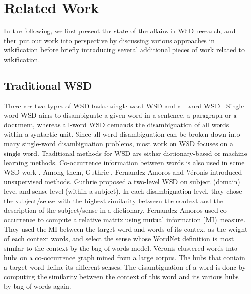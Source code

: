 \section{Related Work}
\label{sec:related}

In the following, we first present the state of the affairs in WSD research,
and then put our work into perspective by discussing
various approaches in wikification before briefly introducing several
additional pieces of work related to wikification.

\subsection{Traditional WSD}
There are two types of WSD tasks: single-word WSD and
all-word WSD . Single word WSD aims to disambiguate a given word
in a sentence, a paragraph or a document, whereas all-word WSD demands
the disambiguation of all words within a syntactic unit.
Since all-word disambiguation can be broken down
into many single-word disambiguation problems, most work on WSD
focuses on a single word.
Traditional methods for WSD are either dictionary-based
or machine learning methods. Co-occurrence information
between words is also used in some WSD work \cite{GuthrieGWA91,Li1998:wcd,ChungKML01,Stokoe2003:WSD,Fernandez-AmorosGSS10,Veronis04:Hyperlex}.
Among them, Guthrie \cite{GuthrieGWA91},
Fernandez-Amoros \cite{Fernandez-AmorosGSS10} and
V\'{e}ronis \cite{Veronis04:Hyperlex} introduced unsupervised methods.
Guthrie \cite{GuthrieGWA91} proposed a two-level WSD on subject (domain) level
and sense level (within a subject). In each
disambiguation level, they chose the subject/sense with the highest similarity
between the context and the description of the subject/sense in a dictionary.
Fernandez-Amoros \cite{Fernandez-AmorosGSS10} used co-occurrence to compute a
relative matrix using mutual information (MI) measure.
They used the MI between the target word and words of its context as the
weight of each context words, and select the sense whose WordNet
definition is most
similar to the context by the bag-of-words model.
V\'{e}ronis \cite{Veronis04:Hyperlex}
clustered words into hubs on a co-occurrence graph mined from a large corpus.
The hubs that contain a target word define its different senses.
The disambiguation of a word is done by computing the similarity between the context
of this word and its various hubs by bag-of-words again.
